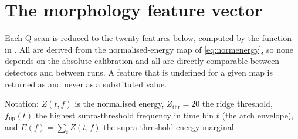 \section{The morphology feature vector}
\label{app:features}

Each Q-scan is reduced to the twenty features below, computed by the function
 in . All are derived from the
normalised-energy map of \cref{eq:normenergy}, so none depends on the absolute
calibration and all are directly comparable between detectors and between
runs. A feature that is undefined for a given map is returned as 
and never as a substituted value.

Notation: $Z(t,f)$ is the normalised energy, $Z_{\mathrm{thr}} = 20$ the ridge
threshold, $f_{\mathrm{up}}(t)$ the highest supra-threshold frequency in time
bin $t$ (the arch envelope), and $E(f) = \sum_t Z(t,f)$ the supra-threshold
energy marginal.

